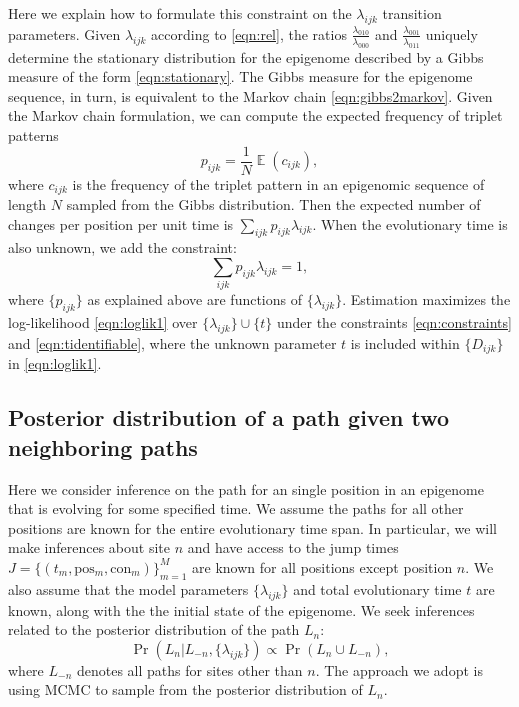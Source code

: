 \documentclass[11pt]{article}
\DeclareMathOperator{\E}{\mathbb{E}}
\newcommand{\context}{\ensuremath{\mathrm{con}}}
\newcommand{\psn}{\ensuremath{\mathrm{pos}}}
\begin{document}
Here we explain how to formulate this constraint on the
$\lambda_{ijk}$ transition parameters. Given $\lambda_{ijk}$ according
to \eqref{eqn:rel}, the ratios $\frac{\lambda_{010}}{\lambda_{000}}$
and $\frac{\lambda_{001}}{\lambda_{011}}$ uniquely determine the
stationary distribution for the epigenome described by a Gibbs measure
of the form \eqref{eqn:stationary}. The Gibbs measure for the
epigenome sequence, in turn, is equivalent to the Markov chain
\eqref{eqn:gibbs2markov}. Given the Markov chain formulation, we can
compute the expected frequency of triplet patterns
\[
p_{ijk} = \frac{1}{N}\E(c_{ijk}),
\]
where $c_{ijk}$ is the frequency of the triplet pattern in an
epigenomic sequence of length $N$ sampled from the Gibbs
distribution. Then the expected number of changes per position per
unit time is $\sum_{ijk}p_{ijk}\lambda_{ijk}$. When the evolutionary
time is also unknown, we add the constraint:
\begin{equation}\label{eqn:tidentifiable}
\sum_{ijk}p_{ijk}\lambda_{ijk} = 1,
\end{equation}
where $\{p_{ijk}\}$ as explained above are functions of
$\{\lambda_{ijk}\}$. Estimation maximizes the log-likelihood
\eqref{eqn:loglik1} over $\{\lambda_{ijk}\}\cup\{t\}$ under the
constraints \eqref{eqn:constraints} and \eqref{eqn:tidentifiable},
where the unknown parameter $t$ is included within $\{D_{ijk}\}$ in
\eqref{eqn:loglik1}.

\subsection{Posterior distribution of a path given two neighboring paths}

Here we consider inference on the path for an single position in an
epigenome that is evolving for some specified time. We assume the
paths for all other positions are known for the entire evolutionary
time span. In particular, we will make inferences about site $n$ and
have access to the jump times $J = \{(t_m, \psn{}_m, \context{}_m)
\}_{m=1}^{M}$ are known for all positions except position $n$.
We also assume that the model parameters $\{\lambda_{ijk}\}$ and total
evolutionary time $t$ are known, along with the the initial state of
the epigenome. We seek inferences related to the posterior
distribution of the path $L_n$:
\[
\Pr(L_n|L_{-n}, \{\lambda_{ijk}\}) \propto \Pr(L_n\cup L_{-n}),
\]
where $L_{-n}$ denotes all paths for sites other than $n$. The
approach we adopt is using MCMC to sample from the posterior
distribution of $L_n$.
\end{document}
